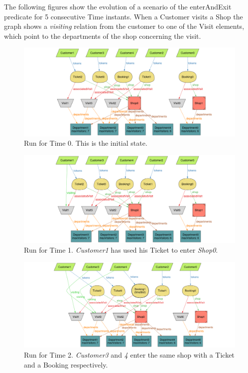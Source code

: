 The following figures show the evolution of a scenario of the enterAndExit predicate for 5 consecutive Time instants. When a Customer visits a Shop the graph shows a \emph{visiting} relation from the customer to one of the Visit elements, which point to the departments of the shop concerning the visit.
\begin{figure}[H]
    \centering
    \includegraphics[height=0.25\textheight]{Images/Alloy/5Customers_v1_t0.png}
    \caption{Run for Time 0. This is the initial state.}
\end{figure}
\begin{figure}[H]
    \centering
    \includegraphics[height=0.25\textheight]{Images/Alloy/5Customers_v1_t1.png}
    \caption{Run for Time 1. \emph{Customer1} has used his Ticket to enter \emph{Shop0}.}
\end{figure}
\begin{figure}[H]
    \centering
    \includegraphics[height=0.25\textheight]{Images/Alloy/5Customers_v1_t2.png}
    \caption{Run for Time 2. \emph{Customer3} and \emph{4} enter the same shop with a Ticket and a Booking respectively.}
\end{figure}

